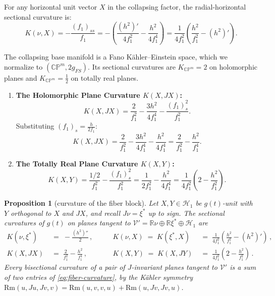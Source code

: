 \documentclass[11pt]{amsart}
\theoremstyle{plain}
\numberwithin{equation}{section}
\newtheorem{proposition}[theorem]{Proposition}
\theoremstyle{definition}
\theoremstyle{remark}
\begin{document}
For any horizontal unit vector $X$ in the collapsing factor, the radial-horizontal sectional curvature is:
\begin{equation}
	K(\nu, X) = -\frac{(f_1)_{ss}}{f_1}= -\left( \frac{(h^2)'}{4f_1^2} - \frac{h^2}{4f_1^4} \right) = \frac{1}{4f_1^2} \left( \frac{h^2}{f_1^2} - (h^2)' \right).
\end{equation}



The collapsing base manifold is a Fano Kähler--Einstein space, which we normalize to $(\mathbb{CP}^m, 2g_{FS})$. Its sectional curvatures are $K_{\mathbb{CP}^m} = 2$ on holomorphic planes and $K_{\mathbb{CP}^m} = \frac{1}{2}$ on totally real planes.
\begin{enumerate}
	\item \textbf{The Holomorphic Plane Curvature $K(X, JX)$:}
	\begin{equation}
		K(X, JX) = \frac{2}{f_1^2} - \frac{3h^2}{4f_1^4} - \frac{(f_1)_s^2}{f_1^2}.
	\end{equation}
	Substituting $(f_1)_s = \frac{h}{2f_1}$:
	\begin{equation}
		K(X, JX) = \frac{2}{f_1^2} - \frac{3h^2}{4f_1^4} - \frac{h^2}{4f_1^4} = \frac{2}{f_1^2} - \frac{h^2}{f_1^4}.
	\end{equation}
	
	\item \textbf{The Totally Real Plane Curvature $K(X, Y)$:}
	\begin{equation}
		K(X, Y) = \frac{1/2}{f_1^2} - \frac{(f_1)_s^2}{f_1^2} = \frac{1}{2f_1^2} - \frac{h^2}{4f_1^4} = \frac{1}{4f_1^2} \left( 2 - \frac{h^2}{f_1^2} \right).
	\end{equation}
\end{enumerate}
\fi
\begin{proposition}[curvature of the fiber block]\label{prop:fiber-curvature}
	Let $X, Y \in \mathcal{H}_1$ be $g (t)$-unit with $Y$ orthogonal to $X$ and $J X$, and recall $J \nu = \xi^*$ up to sign. The sectional curvatures of $g (t)$ on planes tangent to $\mathcal{V}' = \mathbb{R} \nu \oplus \mathbb{R} \xi^* \oplus \mathcal{H}_1$ are
		\begin{equation}\label{eq:fiber-curvature}
		\begin{aligned}
			K ( \nu, \xi^* ) \;&=\; - \frac{( h^2 )''}{2} \,, \qquad & K ( \nu, X ) \;=\; K ( \xi^*, X ) \;&=\; \frac{1}{4 f_1^2} \left( \frac{h^2}{f_1^2} - ( h^2 )' \right) \,, \\
			K ( X, J X ) \;&=\; \frac{2}{f_1^2} - \frac{h^2}{f_1^4} \,, \qquad & K ( X, Y ) \;=\; K ( X, J Y ) \;&=\; \frac{1}{4 f_1^2} \left( 2 - \frac{h^2}{f_1^2} \right) \,.
		\end{aligned}
	\end{equation}
	Every bisectional curvature of a pair of $J$-invariant planes tangent to $\mathcal{V}'$ is a sum of two entries of \eqref{eq:fiber-curvature}, by the Kähler symmetry $\mathrm{Rm} ( u, J u, J v, v ) = \mathrm{Rm} ( u, v, v, u ) + \mathrm{Rm} ( u, J v, J v, u )$.
	
\end{proposition}
\end{document}
